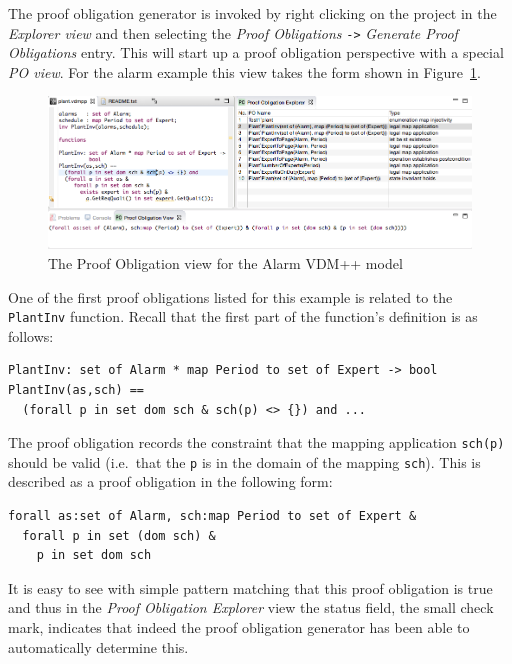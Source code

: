The proof obligation generator is invoked by right clicking on the project in the \emph{Explorer view} and then selecting the \emph{Proof Obligations} \texttt{->} \emph{Generate Proof Obligations} entry. This will start up a proof obligation perspective with a special \emph{PO view}. For the alarm example this view takes the form shown in Figure~\ref{fig:POview}.
%
\begin{figure}[htbp]
\begin{center}
\includegraphics[width=4.5in]{figures/poview}
\caption{The Proof Obligation view for the Alarm VDM++ model\label{fig:POview}}
\end{center}
\end{figure}
%
One of the first proof obligations listed for this example is related to the \texttt{PlantInv} function. Recall that the first part of the function's definition is as follows:

\begin{lstlisting}
PlantInv: set of Alarm * map Period to set of Expert -> bool
PlantInv(as,sch) ==
  (forall p in set dom sch & sch(p) <> {}) and ...
\end{lstlisting}


The proof obligation records the constraint that the mapping application \texttt{sch(p)} should be valid (i.e.\ that the \texttt{p} is in the domain of the mapping \texttt{sch}). This is described as a proof obligation in the following form:

\begin{lstlisting}
forall as:set of Alarm, sch:map Period to set of Expert &
  forall p in set (dom sch) &
    p in set dom sch
\end{lstlisting}
It is easy to see with simple pattern matching that this proof obligation is true and thus in the \emph{Proof Obligation Explorer} view the status field, the small check mark, indicates that indeed the proof obligation generator has been able to automatically determine this.


